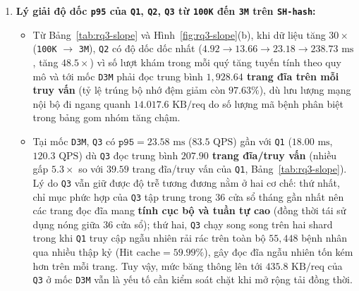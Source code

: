 \begin{enumerate}[leftmargin=0.8cm, itemsep=4pt]
  \item \textbf{Lý giải độ dốc \texttt{p95} của \texttt{Q1}, \texttt{Q2}, \texttt{Q3} từ \texttt{100K} đến \texttt{3M} trên \texttt{SH-hash}:}
  \begin{itemize}[leftmargin=0.6cm, itemsep=3pt]
    \item Từ Bảng~\ref{tab:rq3-slope} và Hình~\ref{fig:rq3-slope}(b), khi dữ liệu tăng $30\times$ (\texttt{100K} $\rightarrow$ \texttt{3M}), \texttt{Q2} có độ dốc dốc nhất ($4.92 \rightarrow 13.66 \rightarrow 23.18 \rightarrow 238.73\text{ ms}$, tăng \textbf{$48.5\times$}) vì số lượt khám trong mỗi quý tăng tuyến tính theo quy mô và tới mốc \texttt{D3M} phải đọc trung bình \textbf{$1{,}928.64$ trang đĩa trên mỗi truy vấn} (tỷ lệ trúng bộ nhớ đệm giảm còn $97.63\%$), dù lưu lượng mạng nội bộ đi ngang quanh $14.0$\textendash $17.6\text{ KB/req}$ do số lượng mã bệnh phân biệt trong bảng gom nhóm tăng chậm.
    \item Tại mốc \texttt{D3M}, \texttt{Q3} có $\texttt{p95} = 23.58\text{ ms}$ ($83.5\text{ QPS}$) gần với \texttt{Q1} ($18.00\text{ ms}$, $120.3\text{ QPS}$) dù \texttt{Q3} đọc trung bình \textbf{$207.90$ trang đĩa/truy vấn} (nhiều gấp $5.3\times$ so với $39.59$ trang đĩa/truy vấn của \texttt{Q1}, Bảng~\ref{tab:rq3-slope}). Lý do \texttt{Q3} vẫn giữ được độ trễ tương đương nằm ở hai cơ chế: thứ nhất, chỉ mục phức hợp của \texttt{Q3} tập trung trong $36$ cửa sổ tháng gần nhất nên các trang đọc đĩa mang \textbf{tính cục bộ và tuần tự cao} (đồng thời tái sử dụng nóng giữa 36 cửa sổ); thứ hai, \texttt{Q3} chạy song song trên hai shard trong khi \texttt{Q1} truy cập ngẫu nhiên rải rác trên toàn bộ $55{,}448$ bệnh nhân qua nhiều thập kỷ ($\text{Hit cache} = 59.99\%$), gây đọc đĩa ngẫu nhiên tốn kém hơn trên mỗi trang. Tuy vậy, mức băng thông lên tới $435.8\text{ KB/req}$ của \texttt{Q3} ở mốc \texttt{D3M} vẫn là yếu tố cần kiểm soát chặt khi mở rộng tải đồng thời.
  \end{itemize}
\end{enumerate}
\FloatBarrier

